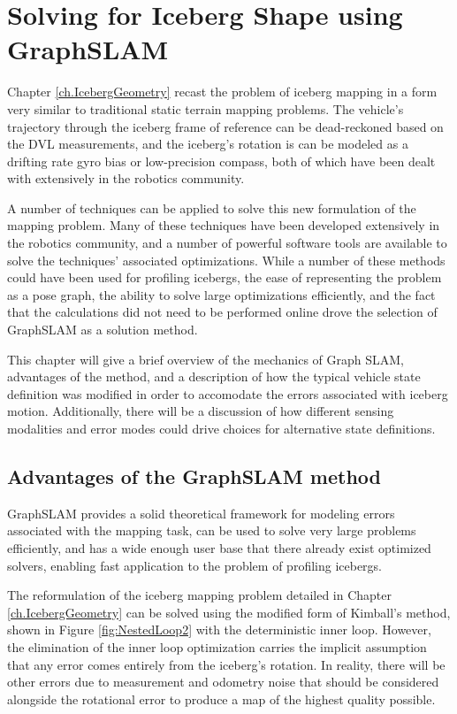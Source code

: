 
\chapter{Solving for Iceberg Shape using GraphSLAM}
\label{ch.GraphSLAM}

Chapter \ref{ch.IcebergGeometry} recast the problem of iceberg mapping in a form very similar to traditional static terrain mapping problems. The vehicle's trajectory through the iceberg frame of reference can be dead-reckoned based on the DVL measurements, and the iceberg's rotation is can be modeled as a drifting rate gyro bias or low-precision compass, both of which have been dealt with extensively in the robotics community.

A number of techniques can be applied to solve this new formulation of the mapping problem. Many of these techniques have been developed extensively in the robotics community, and a number of powerful software tools are available to solve the techniques' associated optimizations. While a number of these methods could have been used for profiling icebergs, the ease of representing the problem as a pose graph, the ability to solve large optimizations efficiently, and the fact that the calculations did not need to be performed online drove the selection of GraphSLAM as a solution method. 

This chapter will give a brief overview of the mechanics of Graph SLAM, advantages of the method, and a description of how the typical vehicle state definition was modified in order to accomodate the errors associated with iceberg motion. Additionally, there will be a discussion of how different sensing modalities and error modes could drive choices for alternative state definitions.

\section{Advantages of the GraphSLAM method}

GraphSLAM provides a solid theoretical framework for modeling errors associated with the mapping task, can be used to solve very large problems efficiently, and has a wide enough user base that there already exist optimized solvers, enabling fast application to the problem of profiling icebergs.

The reformulation of the iceberg mapping problem detailed in Chapter \ref{ch.IcebergGeometry} can be solved using the modified form of Kimball's method, shown in Figure \ref{fig:NestedLoop2} with the deterministic inner loop. However, the elimination of the inner loop optimization carries the implicit assumption that any error comes entirely from the iceberg's rotation. In reality, there will be other errors due to measurement and odometry noise that should be considered alongside the rotational error to produce a map of the highest quality possible. 

